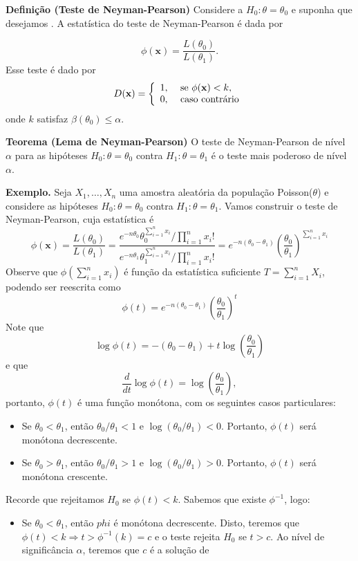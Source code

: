 \documentclass[
  letterpaper,
  DIV=11,
  numbers=noendperiod]{scrartcl}
\providecommand{\tightlist}{%
  \setlength{\itemsep}{0pt}\setlength{\parskip}{0pt}}\usepackage{longtable,booktabs,array}
\begin{document}
\textbf{Definição (Teste de Neyman-Pearson)} Considere a
\(H_0:\theta=\theta_0\) e suponha que desejamos . A estatística do teste
de Neyman-Pearson é dada por

\[\phi(\textbf{x})=\frac{L(\theta_0)}{L(\theta_1)}.\] Esse teste é dado
por
\[D(\textbf{x})=\left\{\begin{array}{ll}1,&\hbox{ se }\phi(\textbf{x})<k,\\
0,&\hbox{ caso contrário}\end{array}\right.\] onde \(k\) satisfaz
\(\beta(\theta_0)\leq \alpha.\)

\textbf{Teorema (Lema de Neyman-Pearson)} O teste de Neyman-Pearson de
nível \(\alpha\) para as hipóteses \(H_0:\theta=\theta_0\) contra
\(H_1:\theta=\theta_1\) é o teste mais poderoso de nível \(\alpha\).

\textbf{Exemplo.} Seja \(X_1,\ldots,X_n\) uma amostra aleatória da
população Poisson(\(\theta\)) e considere as hipóteses
\(H_0:\theta=\theta_0\) contra \(H_1:\theta=\theta_1\). Vamos construir
o teste de Neyman-Pearson, cuja estatística é
\[\phi(\textbf{x})=\frac{L(\theta_0)}{L(\theta_1)}=\frac{e^{-n\theta_0}\theta_0^{\sum_{i=1}^n x_i}/\prod_{i=1}^n x_i!}{e^{-n\theta_1}\theta_1^{\sum_{i=1}^n x_i}/\prod_{i=1}^n x_i!}=e^{-n(\theta_0-\theta_1)}\left(\frac{\theta_0}{\theta_1}\right)^{\sum_{i=1}^{n}x_i}\]
Observe que \(\phi(\sum_{i=1}^n x_i)\) é função da estatística
suficiente \(T=\sum_{i=1}^n X_i\), podendo ser reescrita como
\[\phi(t)=e^{-n(\theta_0-\theta_1)}\left(\frac{\theta_0}{\theta_1}\right)^t\]
Note que
\[\log \phi(t)=-(\theta_0-\theta_1) + t\log\left(\frac{\theta_0}{\theta_1}\right)\]
e que
\[\frac{d}{dt}\log \phi(t)=\log\left(\frac{\theta_0}{\theta_1}\right),\]
portanto, \(\phi(t)\) é uma função monótona, com os seguintes casos
particulares:

\begin{itemize}
\item
  Se \(\theta_0<\theta_1\), então \(\theta_0/\theta_1< 1\) e
  \(\log(\theta_0/\theta_1)<0\). Portanto, \(\phi(t)\) será monótona
  decrescente.
\item
  Se \(\theta_0>\theta_1\), então \(\theta_0/\theta_1> 1\) e
  \(\log(\theta_0/\theta_1)>0\). Portanto, \(\phi(t)\) será monótona
  crescente.
\end{itemize}

Recorde que rejeitamos \(H_0\) se \(\phi(t)<k\). Sabemos que existe
\(\phi^{-1}\), logo:

\begin{itemize}
\tightlist
\item
  Se \(\theta_0<\theta_1\), então \(phi\) é monótona decrescente. Disto,
  teremos que \(\phi(t)<k\Rightarrow t >\phi^{-1}(k)=c\) e o teste
  rejeita \(H_0\) se \(t>c\). Ao nível de significância \(\alpha\),
  teremos que \(c\) é a solução de
\end{itemize}
\end{document}
